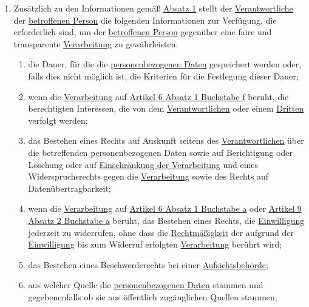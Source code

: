 \begin{enumerate}
\begin{enumerate}
  \end{enumerate}

  \item Zusätzlich zu den Informationen gemäß \hyperref[itm:14-1]{Absatz 1} stellt der \hyperref[itm:04-7]
   {Verantwortliche} der \hyperref[itm:04-1]{betroffenen Person} die folgenden Informationen zur Verfügung, die
   erforderlich sind, um der \hyperref[itm:04-1]{betroffenen Person} gegenüber eine faire und transparente \hyperref
   [itm:04-2]{Verarbeitung} zu gewährleisten:%
  \label{itm:14-2}

  \begin{enumerate}
  
    \item die Dauer, für die die \hyperref[itm:04-1]{personenbezogenen Daten} gespeichert werden oder, falls dies nicht
     möglich ist, die Kriterien für die Festlegung dieser Dauer;%
    \label{itm:14-2a}

    \item wenn die \hyperref[itm:04-2]{Verarbeitung} auf \hyperref[itm:06-1f]{Artikel 6 Absatz 1 Buchstabe f} beruht,
     die berechtigten Interessen, die von dem \hyperref[itm:04-7]{Verantwortlichen} oder einem \hyperref[itm:04-10]
     {Dritten} verfolgt werden;%
    \label{itm:14-2b}

    \item das Bestehen eines Rechts auf Auskunft seitens des \hyperref[itm:04-7]{Verantwortlichen} über die betreffenden
     personenbezogenen Daten sowie auf Berichtigung oder Löschung oder auf \hyperref[itm:04-3]{Einschränkung der
     Verarbeitung} und eines Widerspruchsrechts gegen die \hyperref[itm:04-2]{Verarbeitung} sowie des Rechts auf
     Datenübertragbarkeit;%
    \label{itm:14-2c}

    \item wenn die \hyperref[itm:04-2]{Verarbeitung} auf \hyperref[itm:06-1a]{Artikel 6 Absatz 1 Buchstabe a}
     oder \hyperref[itm:09-2a]{Artikel 9 Absatz 2 Buchstabe a} beruht, das Bestehen eines Rechts, die \hyperref
     [itm:04-11]{Einwilligung} jederzeit zu widerrufen, ohne dass die \hyperref[itm:05-1a]{Rechtmäßigkeit} der aufgrund
     der \hyperref[itm:04-11]{Einwilligung} bis zum Widerruf erfolgten \hyperref[itm:04-2]{Verarbeitung} berührt wird;%
    \label{itm:14-2d}

    \item das Bestehen eines Beschwerderechts bei einer \hyperref[itm:04-21]{Aufsichtsbehörde};%
    \label{itm:14-2e}

    \item aus welcher Quelle die \hyperref[itm:04-1]{personenbezogenen Daten} stammen und gegebenenfalls ob sie aus
     öffentlich zugänglichen Quellen stammen;%
    \label{itm:14-2f}


\end{enumerate}
\end{enumerate}

